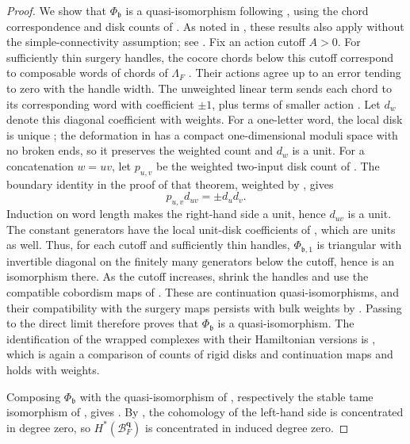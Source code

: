 \documentclass[a4paper]{amsart}
\numberwithin{equation}{section}
\begin{document}
\begin{proof}
We show that $\Phi_{\mathfrak b}$ is a quasi-isomorphism following
\cite[Theorem~83]{ELduality}, using the chord correspondence and disk
counts of \cite{EkholmCurves}. As noted in
\cite[Introduction]{EkholmCurves}, these results also apply without
the simple-connectivity assumption; see \cite[Section~7.3]{EkholmOancea}.
Fix an action cutoff $A>0$. For
sufficiently thin surgery handles, the cocore chords below this cutoff
correspond to composable words of chords of $\Lambda_F$
\cite[Theorem~1.2]{EkholmCurves}. Their actions agree up to an error
tending to zero with the handle width. The unweighted linear term
sends each chord to its corresponding word with coefficient $\pm1$,
plus terms of smaller action \cite[Theorem~7.5(a)]{EkholmCurves}.
Let $d_w$ denote this diagonal coefficient with weights. For a
one-letter word, the local disk is unique
\cite[Lemma~7.4]{EkholmCurves}; the deformation in
\cite[Lemma~7.6]{EkholmCurves} has a compact one-dimensional moduli
space with no broken ends, so it preserves the weighted count and
$d_w$ is a unit. For a concatenation $w=uv$, let $p_{u,v}$ be the
weighted two-input disk count of
\cite[Theorem~7.5(c)]{EkholmCurves}. The boundary identity in the proof
of that theorem, weighted by , gives
\[
 p_{u,v}d_{uv}=\pm d_ud_v.
\]
Induction on word length makes the right-hand side a unit, hence
$d_{uv}$ is a unit. The constant generators have the local unit-disk
coefficients of \cite[Remark~82]{ELduality}, which are units as well.
Thus, for each cutoff and sufficiently thin handles,
$\Phi_{\mathfrak b,1}$ is triangular with invertible diagonal on the
finitely many generators below the cutoff, hence is an isomorphism
there. As the cutoff increases, shrink the handles and use the
compatible cobordism maps of \cite[Theorem~83]{ELduality}. These are
continuation quasi-isomorphisms, and their compatibility with the
surgery maps persists with bulk weights by
. Passing to the direct limit therefore
proves that $\Phi_{\mathfrak b}$ is a quasi-isomorphism.
The identification of the wrapped
complexes with their Hamiltonian versions is
\cite[Appendix~B.1.1, Lemmas~79--80]{ELduality}, which is again a
comparison of counts of rigid disks and continuation maps and holds
with weights.

Composing $\Phi_{\mathfrak{b}}$ with
the quasi-isomorphism of , respectively the stable
tame isomorphism of , gives
. By
, the cohomology of the left-hand side is
concentrated in degree zero, so $H^*(\mathcal B_F^{\boldsymbol q})$ is
concentrated in induced degree zero.


\end{proof}
\end{document}
